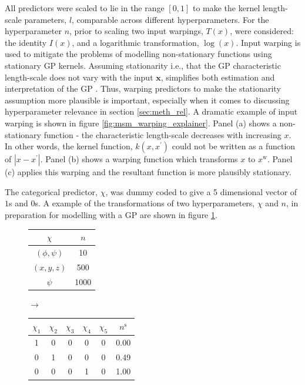 All predictors were scaled to lie in the range $[0, 1]$ to make the kernel length-scale parameters, $l$, comparable across different hyperparameters. For the hyperparameter $n$, prior to scaling two input warpings, $T(x)$, were considered: the identity $I(x)$, and a logarithmic transformation, $\log(x)$.  Input warping is used to mitigate the problems of modelling non-stationary functions using stationary GP kernels. \cite{snoekInputWarpingBayesian2014a} Assuming stationarity i.e., that the GP characteristic length-scale  does not vary with the input $\mathbf{x}$, simplifies both estimation and interpretation of the GP \cite{snoekInputWarpingBayesian2014a}. Thus, warping predictors to make the stationarity assumption more plausible is important, especially when it comes to discussing hyperparameter relevance in section \ref{sec:meth_rel}. A dramatic example of input warping is shown in figure \ref{fig:msm_warping_explainer}. Panel (a) shows a non-stationary function - the characteristic length-scale decreases with increasing $x$. In other words, the kernel function, $k(x, x^{\prime})$ could not be written as a function of $|x-x^{\prime}|$. Panel (b) shows a warping function which transforms $x$ to $x^{\mathrm{w}}$. Panel (c) applies this warping and the resultant function is more plausibly stationary. 

The categorical predictor, $\chi$, was dummy coded \cite{dalyDummyCodingVs2016} to give a 5 dimensional vector of $1$s and $0$s.  A example of the transformations of two hyperparameters, $\chi$ and $n$, in preparation for modelling with a GP are shown in figure \ref{fig:msm_eg_transform}. 

\begin{figure}
    \centering
    \begin{tabular}{|c|c|}
    \hline
      $\chi$    &  $n$ \\
      \hline
    $(\phi, \psi)$    &  10 \\
    $(x, y, z)$ & 500 \\
    $\psi$  & 1000 \\
    \hline
    \end{tabular}
    $\longrightarrow $
    \begin{tabular}{|c|c|c|c|c|c|}
    \hline
      $\chi_{1}$ &$\chi_{2}$ &$\chi_{3}$ &$\chi_{4}$ &$\chi_{5}$ &  $n^{\mathrm{s}}$ \\
      \hline
    1 & 0 & 0 & 0 & 0  &  \num{0.00} \\
    0 & 1 & 0 & 0 & 0  &  \num{0.49} \\
    0 & 0 & 0 & 1 & 0  &  \num{1.00} \\
    \hline
    \end{tabular} 
    \label{fig:msm_eg_transform}
\end{figure}

